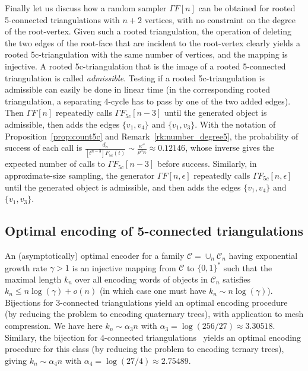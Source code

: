 \documentclass[letter]{amsart}
\numberwithin{theo}{section}
\theoremstyle{remark}
\def\cC{\mathcal{C}}
\def\Ffc{F_{5c}}
\begin{document}
 Finally let us discuss how a random sampler $\Gamma F[n]$ can be obtained for rooted 5-connected triangulations with $n+2$ vertices, with no constraint on the degree of the  root-vertex. Given such a rooted triangulation, the operation of deleting the two edges of the root-face that are incident to the root-vertex clearly yields a rooted 5c-triangulation with the same number of vertices, and the mapping is injective. A rooted 5c-triangulation that is the image of a rooted 5-connected triangulation is called \emph{admissible}. 
 Testing if a rooted 5c-triangulation is admissible can easily be done in linear time (in the corresponding rooted triangulation, a separating 4-cycle has to pass by one of the two added  edges).    
 Then $\Gamma F[n]$ repeatedly calls $\Gamma \Ffc[n-3]$ until the generated object is admissible, then adds the edges $\{v_1,v_4\}$ and $\{v_1,v_3\}$. With the notation of Proposition~\ref{prop:count5c} and Remark~\ref{rk:number_degree5}, the probability of success of each call is $\frac{d_n}{[t^{n-3}]\Ffc(t)}
 \sim \frac{\kappa''}{\rho^3\kappa}\approx 0.12146$, whose inverse gives the expected number of calls to $\Gamma \Ffc[n-3]$ before success. Similarly, in approximate-size sampling, the generator  $\Gamma F[n,\epsilon]$ repeatedly calls $\Gamma \Ffc[n,\epsilon]$ until the generated object is admissible, and then adds  the edges $\{v_1,v_4\}$ and $\{v_1,v_3\}$.


\subsection{Optimal encoding of 5-connected triangulations} 
An (asymptotically) optimal encoder for a family $\cC=\cup_n\cC_n$ having exponential growth rate $\gamma>1$ is an injective mapping 
from $\cC$ to $\{0,1\}^*$ such that the maximal length $k_n$ over all encoding words of objects in $\cC_n$ satisfies $k_n\leq n\log(\gamma)+o(n)$ (in which case one must have $k_n\sim n\log(\gamma)$). Bijections for 3-connected triangulations yield an optimal encoding procedure~\cite{PS06,FuPoScL} (by reducing the problem to encoding quaternary trees), with application to mesh  compression. We have here $k_n\sim \alpha_3n$ with $\alpha_3=\log(256/27)\approx 3.30518$. 
Similary, the bijection for 4-connected triangulations~\cite{Fu07b} yields an optimal encoding procedure for this class (by reducing the problem to encoding ternary trees), giving $k_n\sim \alpha_4n$ with $\alpha_4=\log(27/4)\approx 2.75489$. 
\end{document}
